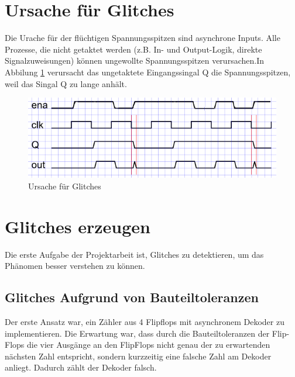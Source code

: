 \section{Ursache für Glitches}\label{sect.glitch_ursache}
Die Urache f\"ur der flüchtigen Spannungsspitzen sind asynchrone Inputs. Alle Prozesse, die nicht getaktet werden (z.B. In- und Output-Logik, direkte Signalzuweisungen) können ungewollte Spannungsspitzen verursachen.In Abbilung \ref{fig.glitch.bild1} verursacht das ungetaktete Eingangssingal Q die Spannungsspitzen, weil das Singal Q zu lange anhält. \\
\begin{figure}[H]
	\centering
	\includegraphics[width=\textwidth]{images/def_glitch_2.png}
	\caption{Ursache f\"ur Glitches}
	\label{fig.glitch.bild1}
\end{figure}



\section{Glitches erzeugen}\label{sect.glitch_detect}
Die erste Aufgabe der Projektarbeit ist, Glitches zu detektieren, um das Phänomen besser verstehen zu können. \\
\subsection{Glitches Aufgrund von Bauteiltoleranzen}\label{sect.glitch_toleranzen}

Der erste Ansatz war, ein Zähler aus 4 Flipflops mit asynchronem Dekoder zu implementieren. Die Erwartung war, dass durch die Bauteiltoleranzen der Flip-Flops die vier Ausgänge an den FlipFlops nicht genau der zu erwartenden nächsten Zahl entspricht, sondern kurzzeitig eine falsche Zahl am Dekoder anliegt.
Dadurch zählt der Dekoder falsch.

